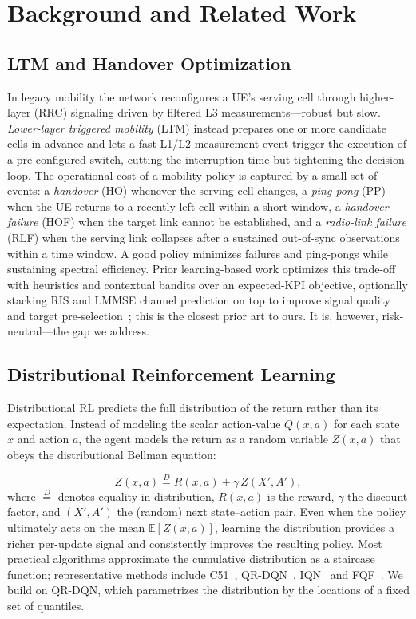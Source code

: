 \documentclass[conference]{IEEEtran}
\begin{document}
\section{Background and Related Work}
\label{sec:related}

\subsection{LTM and Handover Optimization}
In legacy mobility the network reconfigures a UE's serving cell through
higher-layer (RRC) signaling driven by filtered L3 measurements---robust but slow.
\emph{Lower-layer triggered mobility} (LTM) instead prepares one or more candidate cells in advance and lets a fast L1/L2 measurement event trigger the execution of a pre-configured switch, cutting the interruption time but tightening the decision loop.
The operational cost of a mobility policy is captured by a small set of events: a \emph{handover} (HO) whenever the serving cell changes, a \emph{ping-pong} (PP) when the UE returns to a recently left cell within a short window, a \emph{handover failure} (HOF) when the target
link cannot be established, and a \emph{radio-link failure} (RLF) when the serving link collapses after a sustained out-of-sync observations within a time window.
A good policy minimizes failures and ping-pongs while sustaining spectral efficiency.
Prior learning-based work optimizes this trade-off with heuristics and contextual bandits over an expected-KPI objective, optionally stacking RIS and LMMSE channel prediction on top to improve signal quality and target pre-selection~\cite{cmab_ho}; this is the closest prior art to ours.
It is, however, risk-neutral---the gap we address.


\subsection{Distributional Reinforcement Learning}
\label{sec:rel-distrl}
Distributional RL predicts the full distribution of the return rather than its expectation. Instead of modeling the scalar action-value $Q(x,a)$ for each state $x$ and action $a$, the agent models the return as a random variable $Z(x,a)$ that obeys the distributional Bellman equation:

\begin{equation}
Z(x,a) \overset{D}{=} R(x,a) + \gamma\,Z(X',A'),
\label{eq:dist-bellman}
\end{equation}
where $\overset{D}{=}$ denotes equality in distribution, $R(x,a)$ is the reward, $\gamma$ the discount factor, and $(X',A')$ the (random) next state--action pair.
Even when the policy ultimately acts on the mean $\mathbb{E}[Z(x,a)]$, learning the distribution provides a richer per-update signal and consistently improves the resulting policy.
Most practical algorithms approximate the cumulative distribution as a staircase function; representative methods include C51~\cite{c51}, QR-DQN~\cite{qrdqn}, IQN~\cite{iqn} and FQF~\cite{fqf}.
We build on QR-DQN, which parametrizes the distribution by the locations of a fixed set of quantiles.
\end{document}
